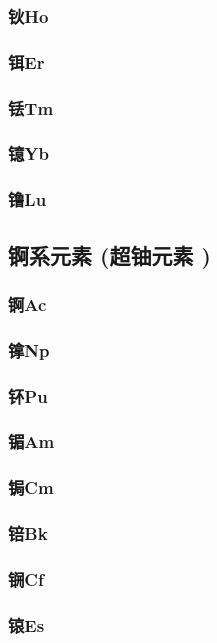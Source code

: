 \documentclass[UTF8]{../03-Chemistry}
\begin{document}
        \subsubsection{钬Ho}
        \subsubsection{铒Er}
        \subsubsection{铥Tm}
        \subsubsection{镱Yb}
        \subsubsection{镥Lu}
    \subsection{锕系元素 (超铀元素 )}
        \subsubsection{锕Ac}
        \subsubsection{镎Np}
        \subsubsection{钚Pu}
        \subsubsection{镅Am}
        \subsubsection{锔Cm}
        \subsubsection{锫Bk}
        \subsubsection{锎Cf}
        \subsubsection{锿Es}
\end{document}
